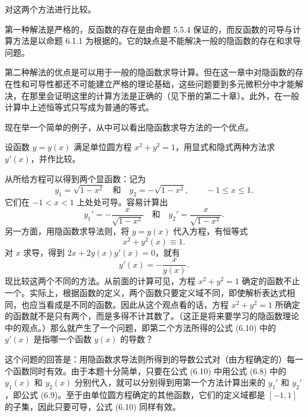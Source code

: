 \begin{xremark}
对这两个方法进行比较。

第一种解法是严格的，反函数的存在是由命题 5.5.4 保证的，而反函数的可导与计算方法是以命题 6.1.1 为根据的。它的缺点是不能解决一般的隐函数的存在和求导问题。

第二种解法的优点是可以用于一般的隐函数求导计算。但在这一章中对隐函数的存在性和可导性都还不可能建立严格的理论基础，这些问题要到多元微积分中才能解决，在那里会证明这里的计算方法是正确的（见下册的第二十章）。此外，在一般计算中上述恒等式只写成为普通的等式。

现在举一个简单的例子，从中可以看出隐函数求导方法的一个优点。
\end{xremark}

\begin{xexample}[6.2.7]
设函数 $y=y(x)$ 满足单位圆方程 $x^2+y^2=1$，用显式和隐式两种方法求 $y'(x)$，并作比较。
\end{xexample}
\begin{xsolution}
从所给方程可以得到两个显函数：记为
\begin{equation}
  y_1=\sqrt{1-x^2}\quad\text{和}\quad y_2=-\sqrt{1-x^2},\qquad -1\le x\le1.
  \tag{6.8}
  \label{eq:6.8}
\end{equation}
它们在 $-1<x<1$ 上处处可导。容易计算出
\begin{equation}
  y_1'=-\frac{x}{\sqrt{1-x^2}}\quad\text{和}\quad
  y_2'=\frac{x}{\sqrt{1-x^2}}.
  \tag{6.9}
  \label{eq:6.9}
\end{equation}
另一方面，用隐函数求导法则，将 $y=y(x)$ 代入方程，有恒等式
\[
  x^2+y^2(x)\equiv1.
\]
对 $x$ 求导，得到 $2x+2y(x)y'(x)=0$，就有
\begin{equation}
  y'(x)=-\frac{x}{y(x)}.
  \tag{6.10}
  \label{eq:6.10}
\end{equation}
现比较这两个不同的方法。从前面的计算可见，方程 $x^2+y^2=1$ 确定的函数不止一个。实际上，根据函数的定义，两个函数只要定义域不同，即使解析表达式相同，也应当看成是不同的函数。因此从这个观点看的话，方程 $x^2+y^2=1$ 所确定的函数就不是只有两个，而是多得不计其数了。（这正是将来要学习的隐函数理论中的观点。）那么就产生了一个问题，即第二个方法所得的公式 (6.10) 中的 $y'(x)$ 是指哪一个函数 $y(x)$ 的导数？

这个问题的回答是：用隐函数求导法则所得到的导数公式对（由方程确定的）每一个函数同时有效。由于本题十分简单，只要在公式 (6.10) 中用公式 (6.8) 中的 $y_1(x)$ 和 $y_2(x)$ 分别代入，就可以分别得到用第一个方法计算出来的 $y_1'$ 和 $y_2'$，即公式 (6.9)。至于由单位圆方程确定的其他函数，它们的定义域都是 $[-1,1]$ 的子集，因此只要可导，公式 (6.10) 同样有效。
\end{xsolution}

